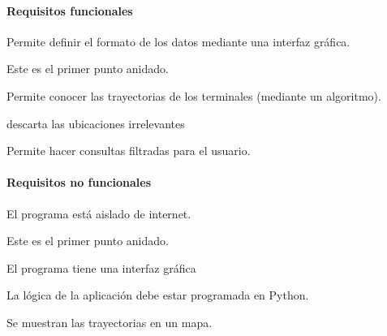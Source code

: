 \paragraph{Requisitos funcionales}

\begin{functional}
        \item Permite definir el formato de los datos mediante una interfaz gráfica.
        \begin{functional}
                \item Este es el primer punto anidado.
        \end{functional}
        \item Permite  conocer las trayectorias de los terminales (mediante un algoritmo).
        \item descarta las ubicaciones irrelevantes
        \item Permite hacer consultas filtradas para el usuario.
\end{functional}

\paragraph{Requisitos no funcionales}

\begin{nonfunctional}
        \item El programa está aislado de internet.
        \begin{nonfunctional}
                \item Este es el primer punto anidado.
        \end{nonfunctional}
        \item El programa tiene una interfaz gráfica
        \item La lógica de la aplicación debe estar programada en Python.
        \item Se muestran las trayectorias en un mapa.
\end{nonfunctional}
